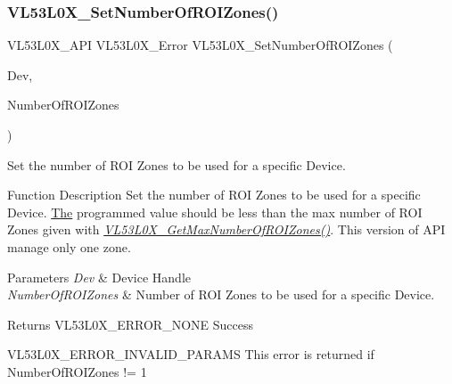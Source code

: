 \subsubsection{\texorpdfstring{V\+L53\+L0\+X\+\_\+\+Set\+Number\+Of\+R\+O\+I\+Zones()}{VL53L0X\_SetNumberOfROIZones()}}
{\footnotesize\ttfamily V\+L53\+L0\+X\+\_\+\+A\+PI V\+L53\+L0\+X\+\_\+\+Error V\+L53\+L0\+X\+\_\+\+Set\+Number\+Of\+R\+O\+I\+Zones (\begin{DoxyParamCaption}\item[{\hyperlink{group__VL53L0X__platform__group_ga2d6405308b1dd524b462f1b8fb97d167}{V\+L53\+L0\+X\+\_\+\+D\+EV}}]{Dev,  }\item[{\hyperlink{vl53l0x__types_8h_aba7bc1797add20fe3efdf37ced1182c5}{uint8\+\_\+t}}]{Number\+Of\+R\+O\+I\+Zones }\end{DoxyParamCaption})}



Set the number of R\+OI Zones to be used for a specific Device. 

\begin{DoxyParagraph}{Function Description}
Set the number of R\+OI Zones to be used for a specific Device. \hyperlink{structThe}{The} programmed value should be less than the max number of R\+OI Zones given with {\itshape \hyperlink{group__VL53L0X__measurement__group_gad3d40b6a62638f54f2a87289030e27e7}{V\+L53\+L0\+X\+\_\+\+Get\+Max\+Number\+Of\+R\+O\+I\+Zones()}}. This version of A\+PI manage only one zone.
\end{DoxyParagraph}

\begin{DoxyParams}{Parameters}
{\em Dev} & Device Handle \\
\hline
{\em Number\+Of\+R\+O\+I\+Zones} & Number of R\+OI Zones to be used for a specific Device. \\
\hline
\end{DoxyParams}
\begin{DoxyReturn}{Returns}
V\+L53\+L0\+X\+\_\+\+E\+R\+R\+O\+R\+\_\+\+N\+O\+NE Success 

V\+L53\+L0\+X\+\_\+\+E\+R\+R\+O\+R\+\_\+\+I\+N\+V\+A\+L\+I\+D\+\_\+\+P\+A\+R\+A\+MS This error is returned if Number\+Of\+R\+O\+I\+Zones != 1 
\end{DoxyReturn}
\mbox{\label{group__VL53L0X__measurement__group_gadd79559c9b3ef6ca4c4d378f08115be4}} 
